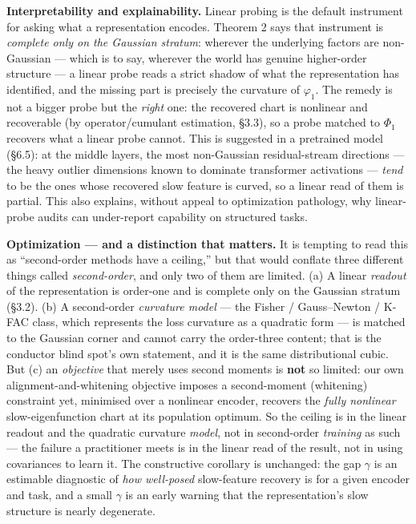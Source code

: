 \documentclass[
  letterpaper,
  11pt]{article}
\theoremstyle{plain}
\theoremstyle{definition}
\theoremstyle{remark}
\begin{document}
\textbf{Interpretability and explainability.} Linear probing is the default instrument for asking what a representation encodes. Theorem 2 says that instrument is \emph{complete only on the Gaussian stratum}: wherever the underlying factors are non-Gaussian --- which is to say, wherever the world has genuine higher-order structure --- a linear probe reads a strict shadow of what the representation has identified, and the missing part is precisely the curvature of \(\varphi_1\). The remedy is not a bigger probe but the \emph{right} one: the recovered chart is nonlinear and recoverable (by operator/cumulant estimation, §3.3), so a probe matched to \(\Phi_1\) recovers what a linear probe cannot. This is suggested in a pretrained model (§6.5): at the middle layers, the most non-Gaussian residual-stream directions --- the heavy outlier dimensions known to dominate transformer activations --- \emph{tend} to be the ones whose recovered slow feature is curved, so a linear read of them is partial. This also explains, without appeal to optimization pathology, why linear-probe audits can under-report capability on structured tasks.

\textbf{Optimization --- and a distinction that matters.} It is tempting to read this as ``second-order methods have a ceiling,'' but that would conflate three different things called \emph{second-order}, and only two of them are limited. (a) A linear \emph{readout} of the representation is order-one and is complete only on the Gaussian stratum (§3.2). (b) A second-order \emph{curvature model} --- the Fisher / Gauss--Newton / K-FAC class, which represents the loss curvature as a quadratic form --- is matched to the Gaussian corner and cannot carry the order-three content; that is the conductor blind spot's own statement, and it is the same distributional cubic. But (c) an \emph{objective} that merely uses second moments is \textbf{not} so limited: our own alignment-and-whitening objective imposes a second-moment (whitening) constraint yet, minimised over a nonlinear encoder, recovers the \emph{fully nonlinear} slow-eigenfunction chart at its population optimum. So the ceiling is in the linear readout and the quadratic curvature \emph{model}, not in second-order \emph{training} as such --- the failure a practitioner meets is in the linear read of the result, not in using covariances to learn it. The constructive corollary is unchanged: the gap \(\gamma\) is an estimable diagnostic of \emph{how well-posed} slow-feature recovery is for a given encoder and task, and a small \(\gamma\) is an early warning that the representation's slow structure is nearly degenerate.
\end{document}

